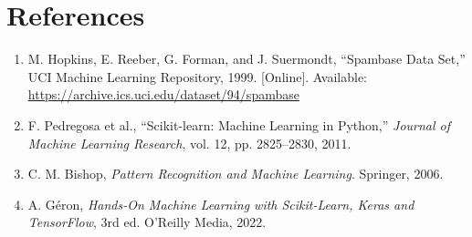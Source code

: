 \documentclass[12pt,a4paper]{article}
\DeclareRobustCommand{\_}{\textunderscore\allowbreak}
\begin{document}
\section{References}
\begin{enumerate}
\item M. Hopkins, E. Reeber, G. Forman, and J. Suermondt, ``Spambase Data
Set,'' UCI Machine Learning Repository, 1999. [Online]. Available:
\url{https://archive.ics.uci.edu/dataset/94/spambase}
\item F. Pedregosa et al., ``Scikit-learn: Machine Learning in Python,''
\emph{Journal of Machine Learning Research}, vol. 12, pp. 2825--2830, 2011.
\item C. M. Bishop, \emph{Pattern Recognition and Machine Learning}. Springer,
2006.
\item A. G\'eron, \emph{Hands-On Machine Learning with Scikit-Learn, Keras
and TensorFlow}, 3rd ed. O'Reilly Media, 2022.
\end{enumerate}
\end{document}
